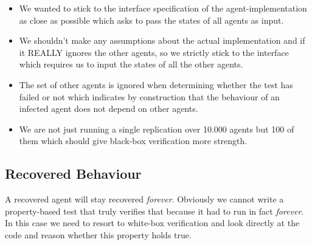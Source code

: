 \begin{itemize}
	\item We wanted to stick to the interface specification of the agent-implementation as close as possible which asks to pass the states of all agents as input.
	\item We shouldn't make any assumptions about the actual implementation and if it REALLY ignores the other agents, so we strictly stick to the interface which requires us to input the states of all the other agents.
	\item The set of other agents is ignored when determining whether the test has failed or not which indicates by construction that the behaviour of an infected agent does not depend on other agents.
	\item We are not just running a single replication over 10.000 agents but 100 of them which should give black-box verification more strength.
\end{itemize}

\subsection{Recovered Behaviour}
A recovered agent will stay recovered \textit{forever}. Obviously we cannot write a property-based test that truly verifies that because it had to run in fact \textit{forever}. In this case we need to resort to white-box verification and look directly at the code and reason whether this property holds true.